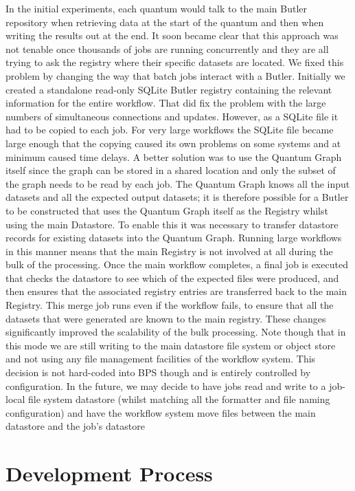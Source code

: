 \documentclass[]{spie}
\begin{document}
In the initial experiments, each quantum would talk to the main Butler repository when retrieving data at the start of the quantum and then when writing the results out at the end.
It soon became clear that this approach was not tenable once thousands of jobs are running concurrently and they are all trying to ask the registry where their specific datasets are located.
We fixed this problem by changing the way that batch jobs interact with a Butler.
Initially we created a standalone read-only SQLite Butler registry containing the relevant information for the entire workflow.
That did fix the problem with the large numbers of simultaneous connections and updates.
However, as a SQLite file it had to be copied to each job.
For very large workflows the SQLite file became large enough that the copying caused its own problems on some systems and at minimum caused time delays.
A better solution was to use the Quantum Graph itself since the graph can be stored in a shared location and only the subset of the graph needs to be read by each job.
The Quantum Graph knows all the input datasets and all the expected output datasets; it is therefore possible for a Butler to be constructed that uses the Quantum Graph itself as the Registry whilst using the main Datastore.
To enable this it was necessary to transfer datastore records for existing datasets into the Quantum Graph.
Running large workflows in this manner means that the main Registry is not involved at all during the bulk of the processing.
Once the main workflow completes, a final job is executed that checks the datastore to see which of the expected files were produced, and then ensures that the associated registry entries are transferred back to the main Registry.
This merge job runs even if the workflow fails, to ensure that all the datasets that were generated are known to the main registry.
These changes significantly improved the scalability of the bulk processing.
Note though that in this mode we are still writing to the main datastore file system or object store and not using any file management facilities of the workflow system.
This decision is not hard-coded into BPS though and is entirely controlled by configuration.
In the future, we may decide to have jobs read and write to a job-local file system datastore (whilst matching all the formatter and file naming configuration) and have the workflow system move files between the main datastore and the job's datastore

\section{Development Process}
\end{document}
